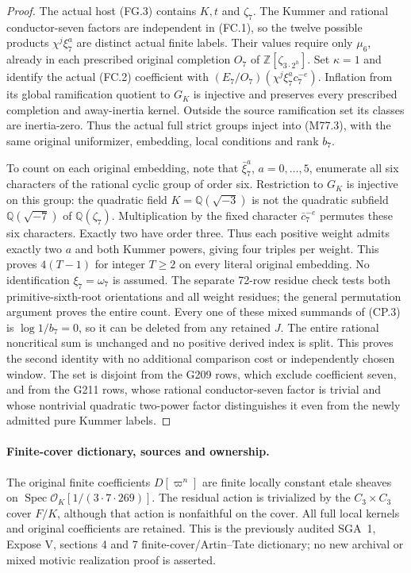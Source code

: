 \begin{proof}
The actual host (FG.3) contains $K,t$ and $\zeta_7$.
The Kummer and rational conductor-seven factors are independent
in (FC.1), so the twelve possible products $\chi^j\xi_7^a$
are distinct actual finite labels. Their values require only
$\mu_6$, already in each prescribed original completion
$O_7$ of $\mathbb Z[\zeta_{3\cdot2^h}]$.
Set $\kappa=1$ and identify the actual (FC.2) coefficient
with $(E_7/O_7)(\chi^j\xi_7^ac_7^{-e})$.
Inflation from its global ramification quotient to $G_K$
is injective and preserves every prescribed completion
and away-inertia kernel. Outside the source ramification
set its classes are inertia-zero. Thus the actual full
strict groups inject into (M77.3), with the same original
uniformizer, embedding, local conditions and rank $b_7$.

To count on each original embedding, note that
$\bar\xi_7^a$, $a=0,\ldots,5$, enumerate all six characters
of the rational cyclic group of order six. Restriction
to $G_K$ is injective on this group: the quadratic field
$K=\mathbb Q(\sqrt{-3})$ is not the quadratic subfield
$\mathbb Q(\sqrt{-7})$ of $\mathbb Q(\zeta_7)$.
Multiplication by the fixed character $\bar c_7^{-e}$
permutes these six characters. Exactly two have order three.
Thus each positive weight admits exactly two $a$ and
both Kummer powers, giving four triples per weight.
This proves $4(T-1)$ for integer $T\geq2$ on every literal
original embedding. No identification $\xi_7=\omega_7$
is assumed. The separate 72-row residue check tests both
primitive-sixth-root orientations and all weight residues;
the general permutation argument proves the entire count.
Every one of these mixed summands of (CP.3) is
$\log1/b_7=0$, so it can be deleted from any retained $J$.
The entire rational noncritical sum is unchanged and
no positive derived index is split. This proves the second
identity with no additional comparison cost or independently
chosen window. The set is disjoint from the G209 rows,
which exclude coefficient seven, and from the G211 rows,
whose rational conductor-seven factor is trivial and whose
nontrivial quadratic two-power factor distinguishes it even
from the newly admitted pure Kummer labels.
\end{proof}

\paragraph{Finite-cover dictionary, sources and ownership.}
The original finite coefficients $D[\varpi^n]$ are finite
locally constant etale sheaves on
$\operatorname{Spec}\mathcal O_K[1/(3\cdot7\cdot269)]$.
The residual action is trivialized by the $C_3\times C_3$
cover $F/K$, although that action is nonfaithful on the cover.
All full local kernels and original coefficients are retained.
This is the previously audited SGA~1, Expose V, sections
4 and 7 finite-cover/Artin--Tate dictionary; no new archival
or mixed motivic realization proof is asserted.

